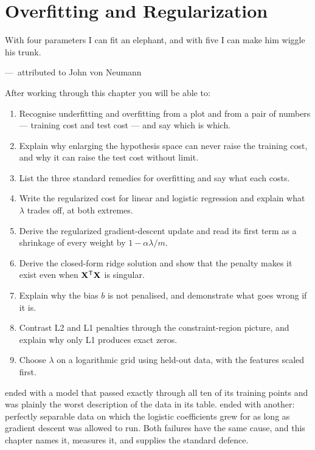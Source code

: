 
\chapter{Overfitting and Regularization}
\label{ch:ch07}

\epigraph{With four parameters I can fit an elephant, and with five I can make
him wiggle his trunk.}{---\ attributed to John von Neumann}

\begin{chapterlearning}
After working through this chapter you will be able to:
\begin{enumerate}
  \item Recognise underfitting and overfitting from a plot and from a pair of
        numbers --- training cost and test cost --- and say which is which.
  \item Explain why enlarging the hypothesis space can never raise the training
        cost, and why it can raise the test cost without limit.
  \item List the three standard remedies for overfitting and say what each
        costs.
  \item Write the regularized cost for linear and logistic regression and
        explain what $\lambda$ trades off, at both extremes.
  \item Derive the regularized gradient-descent update and read its first term
        as a shrinkage of every weight by $1 - \alpha\lambda/m$.
  \item Derive the closed-form ridge solution and show that the penalty makes it
        exist even when $\mathbf{X}^{\mathsf{T}}\mathbf{X}$ is singular.
  \item Explain why the bias $b$ is not penalised, and demonstrate what goes
        wrong if it is.
  \item Contrast L2 and L1 penalties through the constraint-region picture, and
        explain why only L1 produces exact zeros.
  \item Choose $\lambda$ on a logarithmic grid using held-out data, with the
        features scaled first.
\end{enumerate}
\end{chapterlearning}

 ended with a model that passed exactly through all ten of its
training points and was plainly the worst description of the data in its table.
 ended with another: perfectly separable data on which the
logistic coefficients grew for as long as gradient descent was allowed to run.
Both failures have the same cause, and this chapter names it, measures it, and
supplies the standard defence.

